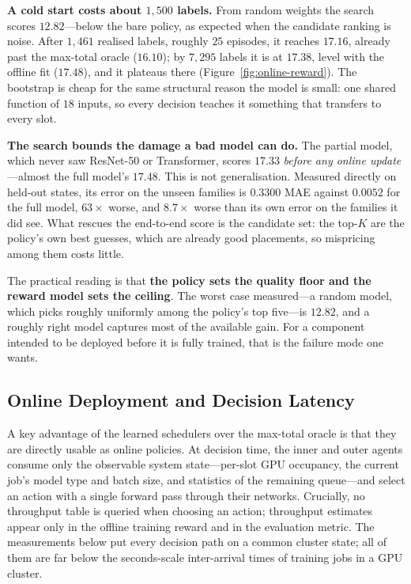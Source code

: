 \documentclass{article}
\begin{document}
\textbf{A cold start costs about $1{,}500$ labels.} From random weights the search
scores $12.82$---below the bare policy, as expected when the candidate ranking is
noise. After $1{,}461$ realised labels, roughly $25$ episodes, it reaches $17.16$,
already past the max-total oracle ($16.10$); by $7{,}295$ labels it is at $17.38$,
level with the offline fit ($17.48$), and it plateaus there
(Figure~\ref{fig:online-reward}). The bootstrap is cheap for the same structural
reason the model is small: one shared function of $18$ inputs, so every decision
teaches it something that transfers to every slot.

\textbf{The search bounds the damage a bad model can do.} The partial model, which
never saw ResNet-50 or Transformer, scores $17.33$ \emph{before any online
update}---almost the full model's $17.48$. This is not generalisation. Measured
directly on held-out states, its error on the unseen families is $0.3300$ MAE
against $0.0052$ for the full model, $63\times$ worse, and $8.7\times$ worse than
its own error on the families it did see. What rescues the end-to-end score is the
candidate set: the top-$K$ are the policy's own best guesses, which are already
good placements, so mispricing among them costs little.

The practical reading is that \textbf{the policy sets the quality floor and the
reward model sets the ceiling}. The worst case measured---a random model, which
picks roughly uniformly among the policy's top five---is $12.82$, and a roughly
right model captures most of the available gain. For a component intended to be
deployed before it is fully trained, that is the failure mode one wants.

\subsection{Online Deployment and Decision Latency}
\label{sec:latency}

A key advantage of the learned schedulers over the max-total oracle is that they are directly usable as online policies. At decision time, the inner and outer agents consume only the observable system state---per-slot GPU occupancy, the current job's model type and batch size, and statistics of the remaining queue---and select an action with a single forward pass through their networks. Crucially, no throughput table is queried when choosing an action; throughput estimates appear only in the offline training reward and in the evaluation metric. The measurements below put every decision path on a common cluster state; all of them are far below the seconds-scale inter-arrival times of training jobs in a GPU cluster.
\end{document}
